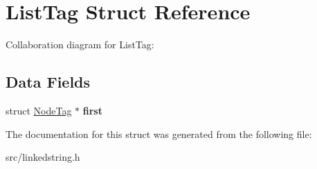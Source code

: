 \hypertarget{structListTag}{}\section{List\+Tag Struct Reference}
\label{structListTag}


Collaboration diagram for List\+Tag\+:
\subsection*{Data Fields}
\begin{DoxyCompactItemize}
\item 
\mbox{\label{structListTag_a02291676687ab4ad6bc1d978b8fa4e1b}} 
struct \hyperlink{structNodeTag}{Node\+Tag} $\ast$ {\bfseries first}
\end{DoxyCompactItemize}


The documentation for this struct was generated from the following file\+:\begin{DoxyCompactItemize}
\item 
src/linkedstring.\+h\end{DoxyCompactItemize}
